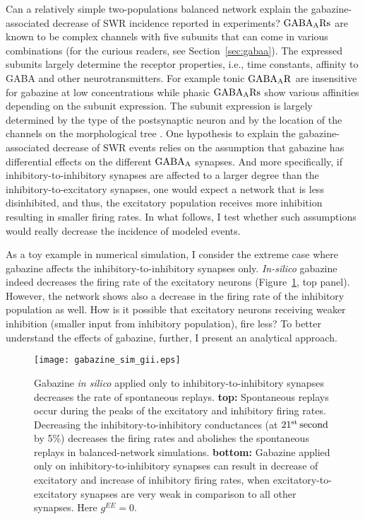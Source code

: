     Can a relatively simple two-populations balanced network explain the
    gabazine-associated decrease of SWR incidence reported in experiments?
    $\rm GABA_A Rs$ are known to be complex channels
    with five subunits that can come in various combinations (for the curious
    readers, see Section~\ref{sec:gabaa}). The expressed subunits largely
    determine the receptor properties, i.e., time constants, affinity to GABA
    and other neurotransmitters. For example tonic $\rm GABA_A R$ are
    insensitive for gabazine \citep{Bai2001, Yeung2003, Behrens2007} at low
    concentrations while phasic $\rm GABA_A Rs$ show various affinities
    depending on the subunit expression. The subunit expression is largely
    determined by the type of the postsynaptic neuron and by the location of
    the channels on the morphological tree \citep{Sieghart2002}. One hypothesis
    to explain the gabazine-associated decrease of SWR events relies on the
    assumption that gabazine has differential effects on the different $\rm
    GABA_A$ synapses. And more specifically, if inhibitory-to-inhibitory
    synapses are affected to a larger degree than the inhibitory-to-excitatory
    synapses, one would expect a network that is less disinhibited, and thus,
    the excitatory population receives more inhibition resulting in smaller
    firing rates. In what follows, I test whether such assumptions would really
    decrease the incidence of modeled events.

    As a toy example in numerical simulation, I consider the extreme case where
    gabazine affects the inhibitory-to-inhibitory synapses only.
    \textit{In-silico} gabazine indeed decreases the firing rate of the
    excitatory neurons (Figure~\ref{fig:gabazine_sim_giionly}, top panel).
    However, the network shows also a decrease in the firing rate of the
    inhibitory population as well.  How is it possible that excitatory neurons
    receiving weaker inhibition (smaller input from inhibitory population),
    fire less? To better understand the effects of gabazine, further, I present
    an analytical approach.
    
    \begin{figure}
      \center
      \texttt{[image: gabazine\_sim\_gii.eps]}
      \caption{
        Gabazine \textit{in silico} applied only to inhibitory-to-inhibitory
        synapses decreases the rate of spontaneous replays. \textbf{top:}
        Spontaneous replays occur during the peaks of the excitatory and
        inhibitory firing rates. Decreasing the inhibitory-to-inhibitory
        conductances (at $21^{\rm st}\, \rm second$ by 5\%) decreases the
        firing rates and abolishes the spontaneous replays in balanced-network
        simulations. \textbf{bottom:} Gabazine applied only on
        inhibitory-to-inhibitory synapses can result in decrease of excitatory
        and increase of inhibitory firing rates, when excitatory-to-excitatory
        synapses are very weak in comparison to all other synapses. Here
        $g^{EE}=0$.
      }
    \label{fig:gabazine_sim_giionly}
    \end{figure}

